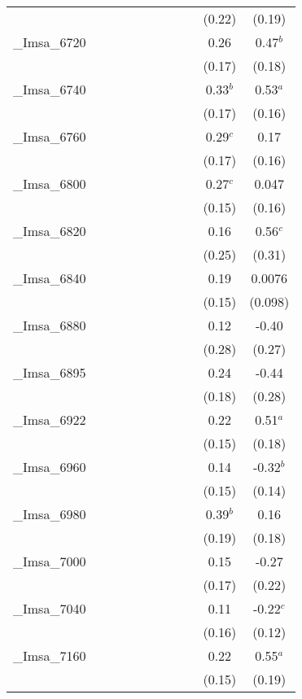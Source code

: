 \documentclass[]{article}
\begin{document}
\begin{tabular}{lcccccccccc}
 &  &  &  &  &  &  &  &  & (0.22) & (0.19) \\
\_Imsa\_6720 &  &  &  &  &  &  &  &  & 0.26 & 0.47$^b$ \\
 &  &  &  &  &  &  &  &  & (0.17) & (0.18) \\
\_Imsa\_6740 &  &  &  &  &  &  &  &  & 0.33$^b$ & 0.53$^a$ \\
 &  &  &  &  &  &  &  &  & (0.17) & (0.16) \\
\_Imsa\_6760 &  &  &  &  &  &  &  &  & 0.29$^c$ & 0.17 \\
 &  &  &  &  &  &  &  &  & (0.17) & (0.16) \\
\_Imsa\_6800 &  &  &  &  &  &  &  &  & 0.27$^c$ & 0.047 \\
 &  &  &  &  &  &  &  &  & (0.15) & (0.16) \\
\_Imsa\_6820 &  &  &  &  &  &  &  &  & 0.16 & 0.56$^c$ \\
 &  &  &  &  &  &  &  &  & (0.25) & (0.31) \\
\_Imsa\_6840 &  &  &  &  &  &  &  &  & 0.19 & 0.0076 \\
 &  &  &  &  &  &  &  &  & (0.15) & (0.098) \\
\_Imsa\_6880 &  &  &  &  &  &  &  &  & 0.12 & -0.40 \\
 &  &  &  &  &  &  &  &  & (0.28) & (0.27) \\
\_Imsa\_6895 &  &  &  &  &  &  &  &  & 0.24 & -0.44 \\
 &  &  &  &  &  &  &  &  & (0.18) & (0.28) \\
\_Imsa\_6922 &  &  &  &  &  &  &  &  & 0.22 & 0.51$^a$ \\
 &  &  &  &  &  &  &  &  & (0.15) & (0.18) \\
\_Imsa\_6960 &  &  &  &  &  &  &  &  & 0.14 & -0.32$^b$ \\
 &  &  &  &  &  &  &  &  & (0.15) & (0.14) \\
\_Imsa\_6980 &  &  &  &  &  &  &  &  & 0.39$^b$ & 0.16 \\
 &  &  &  &  &  &  &  &  & (0.19) & (0.18) \\
\_Imsa\_7000 &  &  &  &  &  &  &  &  & 0.15 & -0.27 \\
 &  &  &  &  &  &  &  &  & (0.17) & (0.22) \\
\_Imsa\_7040 &  &  &  &  &  &  &  &  & 0.11 & -0.22$^c$ \\
 &  &  &  &  &  &  &  &  & (0.16) & (0.12) \\
\_Imsa\_7160 &  &  &  &  &  &  &  &  & 0.22 & 0.55$^a$ \\
 &  &  &  &  &  &  &  &  & (0.15) & (0.19) \\

\end{tabular}
\end{document}
